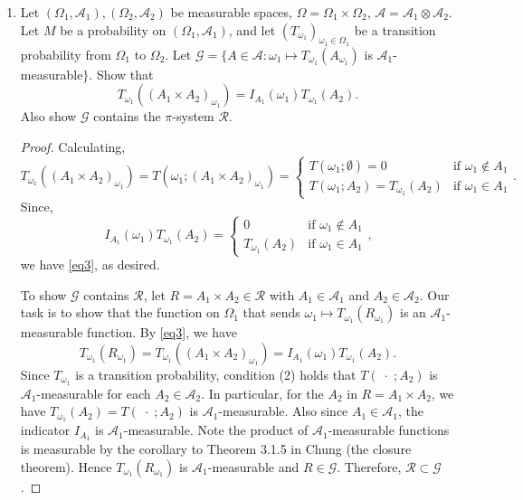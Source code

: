 \documentclass[letterpaper, 12pt]{article}
\newcommand{\cA}{\mathcal{A}}
\newcommand{\sG}{\mathscr{G}}
\newcommand{\sP}{\mathscr{P}}
\newcommand{\cR}{\mathcal{R}}
\begin{document}
\begin{enumerate}
\begin{proof}
By hypothesis, $\sP \subset \sG$, whence by the $\pi$-$\lambda$ theorem we have $\cA_2 = \sigma(\sP) \subset \sG$. 
By the definition of $\sG$, it is clear $\sG \subset \cA_2$. Therefore $\sG = \cA_2$, which demonstrates (2). 
\end{proof}
\item
Let $(\Omega_1,\cA_1),(\Omega_2,\cA_2)$ be measurable spaces, $\Omega=\Omega_1\times\Omega_2$, $\cA=\cA_1\otimes\cA_2$. 
Let $M$ be a probability on $(\Omega_1,\cA_1)$, and let $(T_{\omega_1})_{\omega_1\in\Omega_1}$ be a transition probability from $\Omega_1$ to $\Omega_2$. 
Let $\sG = \{ A\in\cA:\omega_1\mapsto T_{\omega_1}(A_{\omega_1})$ is $\cA_1$-measurable$\}$. 
Show that
\begin{equation} 
\label{eq3}
T_{\omega_1}((A_1\times A_2)_{\omega_1}) = I_{A_1}(\omega_1)T_{\omega_1}(A_2).
\end{equation}
Also show $\sG$ contains the $\pi$-system $\cR$.
\begin{proof}
Calculating, 
\[
T_{\omega_1}((A_1 \times A_2)_{\omega_1})
= T(\omega_1; (A_1 \times A_2)_{\omega_1})
= 
\begin{cases}
T(\omega_1; \emptyset) = 0 & \text{if $\omega_1 \notin A_1$} \\
T(\omega_1; A_2) = T_{\omega_1}(A_2) & \text{if $\omega_1 \in A_1$}
\end{cases}
\text{.}
\]
Since,
\[
I_{A_1}(\omega_1) T_{\omega_1}(A_2)
=
\begin{cases}
0 & \text{if $\omega_1 \notin A_1$} \\
T_{\omega_1}(A_2) & \text{if $\omega_1 \in A_1$}
\end{cases}
\text{,}
\]
we have \eqref{eq3}, as desired.

To show $\sG$ contains $\cR$, let $R = A_1 \times A_2 \in \cR$ with $A_1 \in \cA_1$ and $A_2 \in \cA_2$. Our task is to show that the function on $\Omega_1$ that sends $\omega_1\mapsto T_{\omega_1}(R_{\omega_1})$ is an $\cA_1$-measurable function. 
By \eqref{eq3}, we have
\[
T_{\omega_1}(R_{\omega_1}) = T_{\omega_1}((A_1\times A_2)_{\omega_1}) = I_{A_1}(\omega_1)T_{\omega_1}(A_2).
\]
Since $T_{\omega_1}$ is a transition probability, condition (2) holds that $T(\;\cdot\;;A_2)$ is $\cA_1$-measurable for each $A_2\in\cA_2$. In particular, for the $A_2$ in $R = A_1 \times A_2$, we have $T_{\omega_1}(A_2)=T(\;\cdot\;;A_2)$ is $\cA_1$-measurable.
Also since $A_1 \in \cA_1$, the indicator $I_{A_1}$ is $\cA_1$-measurable. Note the product of $\cA_1$-measurable functions is measurable by the corollary to Theorem 3.1.5 in Chung (the closure theorem). 
Hence $T_{\omega_1}(R_{\omega_1})$ is $\cA_1$-measurable and $R \in \sG$. Therefore, $\cR \subset \sG$. 
\end{proof}


\end{enumerate}
\end{document}

